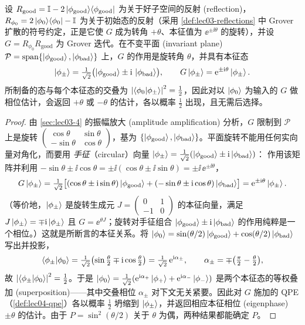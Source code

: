 \begin{theorem}
\label{thm:lec05-ae}
设 $R_{\mathrm{good}}=\mathbb{I}-2\ket{\phi_{\mathrm{good}}}\!\bra{\phi_{\mathrm{good}}}$ 为关于好子空间的反射 (reflection)，$R_{\phi_0}=2\ket{\phi_0}\!\bra{\phi_0}-\mathbb{I}$ 为关于初始态的反射（采用 \cref{def:lec03-reflections} 中 Grover 扩散的符号约定，正是它使 $G$ 成为转角 $+\theta$、本征值为 $\ee^{\pm\ii\theta}$ 的旋转），并设 $G=R_{\phi_0}R_{\mathrm{good}}$ 为 Grover 迭代。在不变平面 (invariant plane)
$\mathcal P=\operatorname{span}\{\ket{\phi_{\mathrm{good}}},
\ket{\phi_{\mathrm{bad}}}\}$ 上，$G$ 的作用是旋转角 $\theta$，并具有本征态
\[
  \ket{\phi_{\pm}}=\tfrac{1}{\sqrt2}\bigl(\ket{\phi_{\mathrm{good}}}
                    \pm\mathrm{i}\,\ket{\phi_{\mathrm{bad}}}\bigr),
  \qquad G\ket{\phi_{\pm}}=\mathrm{e}^{\pm\mathrm{i}\theta}\ket{\phi_{\pm}}.
\]
所制备的态与每个本征态的交叠为 $\left\lvert \braket{\phi_0|\phi_{\pm}} \right\rvert^2=\tfrac12$，因此对以 $\ket{\phi_0}$ 为输入的 $G$ 做相位估计，会返回 $+\theta$ 或 $-\theta$ 的估计，各以概率 $\tfrac12$ 出现，且无需后选择。
\end{theorem}

\begin{proof}
由 \cref{sec:lec03-4} 的振幅放大 (amplitude amplification) 分析，$G$ 限制到 $\mathcal P$ 上是旋转
$\left(\begin{smallmatrix}\cos\theta&\sin\theta\\-\sin\theta&\cos\theta
\end{smallmatrix}\right)$，基为
$\{\ket{\phi_{\mathrm{good}}},\ket{\phi_{\mathrm{bad}}}\}$。平面旋转不能用任何实向量对角化，而要用
\emph{手征}（circular）向量
$\ket{\phi_\pm}=\tfrac{1}{\sqrt2}(\ket{\phi_{\mathrm{good}}}\pm\mathrm{i}\ket{\phi_{\mathrm{bad}}})$：
作用该矩阵并利用
$-\sin\theta\pm\ii\cos\theta=\pm\ii(\cos\theta\pm\ii\sin\theta)=\pm\ii\,\ee^{\pm\ii\theta}$，
\[
  G\ket{\phi_\pm}
  =\tfrac{1}{\sqrt2}\bigl[(\cos\theta\pm\mathrm{i}\sin\theta)\ket{\phi_{\mathrm{good}}}
      +(-\sin\theta\pm\mathrm{i}\cos\theta)\ket{\phi_{\mathrm{bad}}}\bigr]
  =\mathrm{e}^{\pm\mathrm{i}\theta}\ket{\phi_\pm}.
\]
（等价地，$\ket{\phi_\pm}$ 是旋转生成元 $J=\left(\begin{smallmatrix}0&1\\-1&0\end{smallmatrix}\right)$
的本征向量，满足 $J\ket{\phi_\pm}=\mp\mathrm{i}\ket{\phi_\pm}$ 且 $G=\ee^{\theta J}$；旋转对手征组合
$\ket{\phi_{\mathrm{good}}}\pm\mathrm{i}\ket{\phi_{\mathrm{bad}}}$ 的作用纯粹是一个相位。）这就是所断言的本征关系。将
$\ket{\phi_0}=\sin(\theta/2)\ket{\phi_{\mathrm{good}}}
+\cos(\theta/2)\ket{\phi_{\mathrm{bad}}}$ 写出并投影，
\[
  \braket{\phi_{\pm}|\phi_0}
  =\tfrac{1}{\sqrt2}\bigl(\sin\tfrac{\theta}{2}\mp\mathrm{i}\cos\tfrac{\theta}{2}\bigr)
  =\tfrac{1}{\sqrt2}\,\mathrm{e}^{\mathrm{i}\alpha_\pm},
  \qquad \alpha_\pm=\mp\bigl(\tfrac{\pi}{2}-\tfrac{\theta}{2}\bigr),
\]
故 $\left\lvert \braket{\phi_{\pm}|\phi_0} \right\rvert^2=\tfrac12$。于是
$\ket{\phi_0}=\tfrac{1}{\sqrt2}(\mathrm{e}^{\mathrm{i}\alpha_+}\ket{\phi_+}+\mathrm{e}^{\mathrm{i}\alpha_-}\ket{\phi_-})$
是两个本征态的等权叠加 (superposition)——其中交叠相位 $\alpha_\pm$ 对下文无关紧要。因此对 $G$
施加的 QPE（\cref{def:lec04-qpe}）各以概率 $\tfrac12$ 坍缩到 $\ket{\phi_\pm}$，并返回相应本征相位
(eigenphase) $\pm\theta$ 的估计。由于 $P=\sin^2(\theta/2)$ 关于 $\theta$ 为偶，两种结果都能确定 $P$。
\end{proof}

